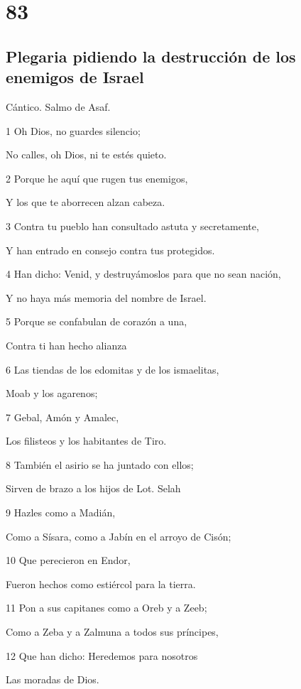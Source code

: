 \chapter{83}

\section*{Plegaria pidiendo la destrucción de los enemigos de Israel}

\par Cántico. Salmo de Asaf.

\par 1 Oh Dios, no guardes silencio;
\par No calles, oh Dios, ni te estés quieto.
\par 2 Porque he aquí que rugen tus enemigos,
\par Y los que te aborrecen alzan cabeza.
\par 3 Contra tu pueblo han consultado astuta y secretamente,
\par Y han entrado en consejo contra tus protegidos.
\par 4 Han dicho: Venid, y destruyámoslos para que no sean nación,
\par Y no haya más memoria del nombre de Israel.
\par 5 Porque se confabulan de corazón a una,
\par Contra ti han hecho alianza
\par 6 Las tiendas de los edomitas y de los ismaelitas,
\par Moab y los agarenos;
\par 7 Gebal, Amón y Amalec,
\par Los filisteos y los habitantes de Tiro.
\par 8 También el asirio se ha juntado con ellos;
\par Sirven de brazo a los hijos de Lot. Selah
\par 9 Hazles como a Madián,
\par Como a Sísara, como a Jabín en el arroyo de Cisón;
\par 10 Que perecieron en Endor,
\par Fueron hechos como estiércol para la tierra.
\par 11 Pon a sus capitanes como a Oreb y a Zeeb;
\par Como a Zeba y a Zalmuna a todos sus príncipes,
\par 12 Que han dicho: Heredemos para nosotros
\par Las moradas de Dios.
